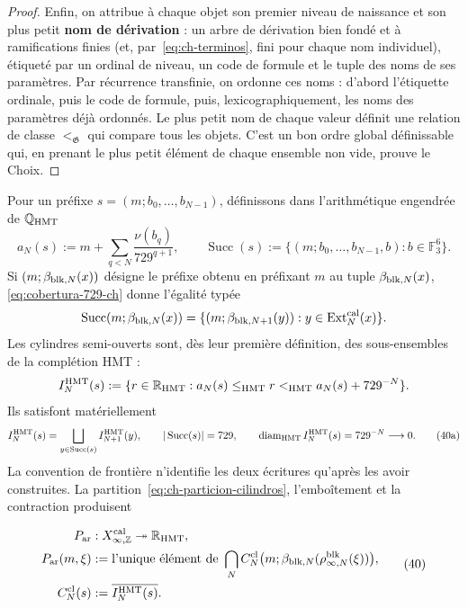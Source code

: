 \begin{proof}
Enfin, on attribue à chaque objet son premier niveau de naissance et son
plus petit \textbf{nom de dérivation} : un arbre de dérivation bien fondé et
à ramifications finies (et, par~\eqref{eq:ch-terminos}, fini pour chaque nom individuel), étiqueté par un
ordinal de niveau, un code de formule et le tuple des noms de ses paramètres.
Par récurrence transfinie, on ordonne ces noms : d’abord l’étiquette ordinale,
puis le code de formule, puis, lexicographiquement, les noms des
paramètres déjà ordonnés. Le plus petit nom de chaque valeur définit une relation de
classe \(<_{\mathfrak G}\) qui compare tous les objets. C’est un bon ordre
global définissable qui, en prenant le plus petit élément de chaque ensemble non vide,
prouve le Choix.
\end{proof}





Pour un préfixe \(s=(m;b_0,\ldots,b_{N-1})\), définissons dans l’arithmétique
engendrée de \(\mathbb Q_{\rm HMT}\)
\[
 a_N(s):=m+\sum_{q<N}\frac{\nu(b_q)}{729^{q+1}},
 \qquad
 \operatorname{Succ}(s):=
 \{(m;b_0,\ldots,b_{N-1},b):b\in\mathbb F_3^6\}.
\]
Si \((m;\beta_{{\rm blk},N}(x))\) désigne le préfixe obtenu en préfixant
\(m\) au tuple \(\beta_{{\rm blk},N}(x)\),
\eqref{eq:cobertura-729-ch} donne l’égalité typée
\[
 \operatorname{Succ}(m;\beta_{{\rm blk},N}(x))
 =\{(m;\beta_{{\rm blk},N+1}(y)):
       y\in\operatorname{Ext}^{\rm cal}_N(x)\}.
\]
Les cylindres semi-ouverts sont, dès leur première définition, des sous-ensembles de
la complétion HMT :
\[
 I_N^{\rm HMT}(s):=
 \{r\in\mathbb R_{\rm HMT}:
      a_N(s)\le_{\rm HMT}r<_{\rm HMT}a_N(s)+729^{-N}\}.
\]
Ils satisfont matériellement
\[
 I_N^{\rm HMT}(s)=
 \bigsqcup_{y\in\operatorname{Succ}(s)}I_{N+1}^{\rm HMT}(y),
 \qquad |\operatorname{Succ}(s)|=729,
 \qquad \operatorname{diam}_{\rm HMT}I_N^{\rm HMT}(s)
      =729^{-N}\longrightarrow0.
\tag{40a}\label{eq:ch-particion-cilindros}
\]
La convention de frontière n’identifie les deux écritures qu’après
les avoir construites. La partition~\eqref{eq:ch-particion-cilindros}, l’emboîtement et la contraction produisent

\[
\begin{aligned}
 P_{\rm ar}&:X_{\infty,\mathbb Z}^{\rm cal}
     \twoheadrightarrow\mathbb R_{\rm HMT},\\
 P_{\rm ar}(m,\xi)
   &:=\text{l’unique élément de }
     \bigcap_N C_N^{\rm cl}
       \bigl(m;\beta_{{\rm blk},N}(\rho^{\rm blk}_{\infty,N}(\xi))\bigr),\\
 C_N^{\rm cl}(s)&:=\overline{I_N^{\rm HMT}(s)}.
\end{aligned}
\tag{40}\label{eq:ch-proyeccion-arquimediana}
\]

